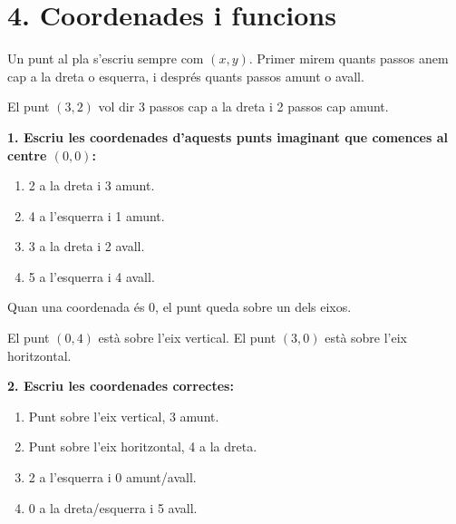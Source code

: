 \documentclass[12pt,a4paper]{article}
\begin{document}
\section*{4. Coordenades i funcions}

\begin{capsula}
Un punt al pla s'escriu sempre com $(x,y)$. Primer mirem quants passos anem cap a la dreta o esquerra, i després quants passos amunt o avall.
\end{capsula}

\begin{exemple}
El punt $(3,2)$ vol dir 3 passos cap a la dreta i 2 passos cap amunt.
\end{exemple}

\textbf{1. Escriu les coordenades d'aquests punts imaginant que comences al centre $(0,0)$:}
\begin{enumerate}[label=\alph*)]
    \item 2 a la dreta i 3 amunt. \vspace{0.6cm}
    \item 4 a l'esquerra i 1 amunt. \vspace{0.6cm}
    \item 3 a la dreta i 2 avall. \vspace{0.6cm}
    \item 5 a l'esquerra i 4 avall. \vspace{0.6cm}
\end{enumerate}

\begin{capsula}
Quan una coordenada és 0, el punt queda sobre un dels eixos.
\end{capsula}

\begin{exemple}
El punt $(0,4)$ està sobre l'eix vertical. El punt $(3,0)$ està sobre l'eix horitzontal.
\end{exemple}

\textbf{2. Escriu les coordenades correctes:}
\begin{enumerate}[label=\alph*)]
    \item Punt sobre l'eix vertical, 3 amunt. \vspace{0.6cm}
    \item Punt sobre l'eix horitzontal, 4 a la dreta. \vspace{0.6cm}
    \item 2 a l'esquerra i 0 amunt/avall. \vspace{0.6cm}
    \item 0 a la dreta/esquerra i 5 avall. \vspace{0.6cm}
\end{enumerate}
\end{document}
